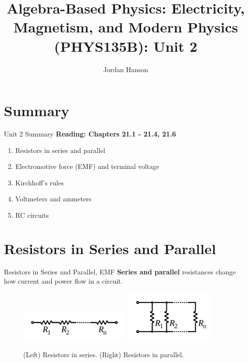 \documentclass{beamer}
\title{Algebra-Based Physics: Electricity, Magnetism, and Modern Physics (PHYS135B): Unit 2}
\author{Jordan Hanson}
\institute{Whittier College Department of Physics and Astronomy}
\begin{document}
\maketitle

\section{Summary}

\begin{frame}{Unit 2 Summary}
\textbf{Reading: Chapters 21.1 - 21.4, 21.6}
\begin{enumerate}
\item Resistors in series and parallel
\item Electromotive force (EMF) and terminal voltage
\item Kirchhoff's rules
\item Voltmeters and ammeters
\item RC circuits
\end{enumerate}
\end{frame}

\section{Resistors in Series and Parallel}

\begin{frame}{Resistors in Series and Parallel, EMF}
\textbf{\alert{Series and parallel}} resistances change how current and power flow in a circuit.
\begin{figure}
\centering
\includegraphics[width=0.5\textwidth]{figures/series_resist.png}
\includegraphics[width=0.4\textwidth]{figures/parallel_resist.png}
\caption{\label{fig:series_and_parallel} (Left) Resistors in series. (Right) Resistors in parallel.}
\end{figure}
\end{frame}
\end{document}

